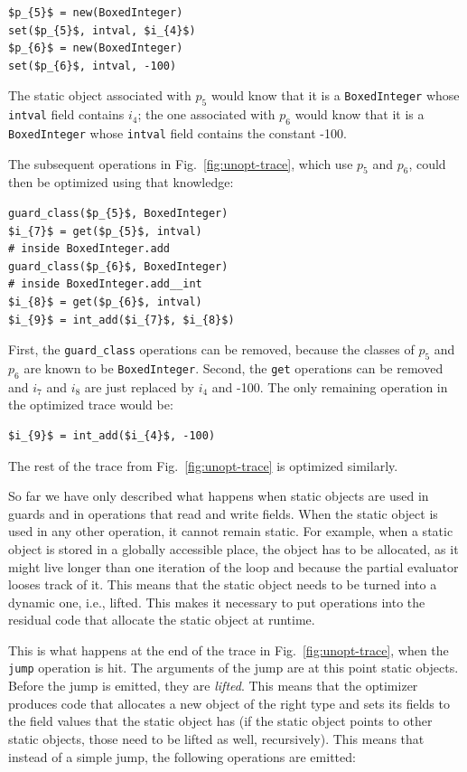\documentclass[preprint]{sigplanconf}
\newcommand\ie{i.e.,\xspace}
\begin{document}
\begin{lstlisting}[mathescape,xleftmargin=20pt]
$p_{5}$ = new(BoxedInteger)
set($p_{5}$, intval, $i_{4}$)
$p_{6}$ = new(BoxedInteger)
set($p_{6}$, intval, -100)
\end{lstlisting}


The static object associated with $p_{5}$ would know that it is a
\lstinline{BoxedInteger} whose \lstinline{intval} field contains $i_{4}$; the
one associated with $p_{6}$ would know that it is a \lstinline{BoxedInteger}
whose \lstinline{intval} field contains the constant -100.

The subsequent operations in Fig.~\ref{fig:unopt-trace},
 which use $p_{5}$ and $p_{6}$, could then be
optimized using that knowledge:

\begin{lstlisting}[mathescape,xleftmargin=20pt]
guard_class($p_{5}$, BoxedInteger)
$i_{7}$ = get($p_{5}$, intval)
# inside BoxedInteger.add
guard_class($p_{6}$, BoxedInteger)
# inside BoxedInteger.add__int
$i_{8}$ = get($p_{6}$, intval)
$i_{9}$ = int_add($i_{7}$, $i_{8}$)
\end{lstlisting}

First, the \lstinline{guard_class} operations can be removed, because the classes of $p_{5}$ and
$p_{6}$ are known to be \lstinline{BoxedInteger}. Second, the \lstinline{get} operations can be removed
and $i_{7}$ and $i_{8}$ are just replaced by $i_{4}$ and -100. The only
remaining operation in the optimized trace would be:

\begin{lstlisting}[mathescape,xleftmargin=20pt]
$i_{9}$ = int_add($i_{4}$, -100)
\end{lstlisting}

The rest of the trace from Fig.~\ref{fig:unopt-trace} is optimized similarly.

So far we have only described what happens when static objects are used in guards and in
operations that read and write fields. When the static
object is used in any other operation, it cannot remain static. For example, when
a static object is stored in a globally accessible place, the object has to
be allocated, as it might live longer than one iteration of the loop
and because the partial evaluator looses track of it. This means that the static
object needs to be turned into a dynamic one, \ie lifted. This makes it
necessary to put operations into the residual code that allocate the
static object at runtime.

This is what happens at the end of the trace in Fig.~\ref{fig:unopt-trace}, when the \lstinline{jump} operation
is hit. The arguments of the jump are at this point static objects. Before the
jump is emitted, they are \emph{lifted}. This means that the optimizer produces code
that allocates a new object of the right type and sets its fields to the field
values that the static object has (if the static object points to other static
objects, those need to be lifted as well, recursively). This means that instead of a simple jump,
the following operations are emitted:
\end{document}
